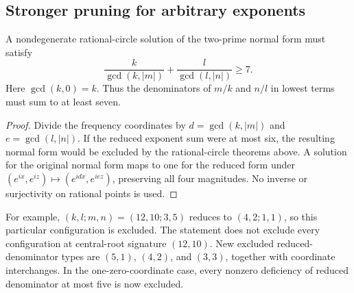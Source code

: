 \subsection{Stronger pruning for arbitrary exponents}
\begin{corollary}\label{cor:reduced}
A nondegenerate rational-circle solution of the two-prime normal form must satisfy
\begin{equation}\label{eq:gcdcriterion}
\boxed{\frac{k}{\gcd(k,|m|)}+\frac{l}{\gcd(l,|n|)}\ge7.}
\end{equation}
Here $\gcd(k,0)=k$. Thus the denominators of $m/k$ and $n/l$ in lowest terms must sum to at least seven.
\end{corollary}
\begin{proof}
Divide the frequency coordinates by $d=\gcd(k,|m|)$ and $e=\gcd(l,|n|)$. If the reduced exponent sum were at most six, the resulting normal form would be excluded by the rational-circle theorems above. A solution for the original normal form maps to one for the reduced form under $(e^{ix},e^{iz})\mapsto(e^{idx},e^{iez})$, preserving all four magnitudes. No inverse or surjectivity on rational points is used.
\end{proof}
For example, $(k,l;m,n)=(12,10;3,5)$ reduces to $(4,2;1,1)$, so this particular configuration is excluded. The statement does not exclude every configuration at central-root signature $(12,10)$. New excluded reduced-denominator types are $(5,1)$, $(4,2)$, and $(3,3)$, together with coordinate interchanges. In the one-zero-coordinate case, every nonzero deficiency of reduced denominator at most five is now excluded.
